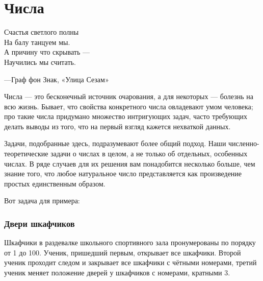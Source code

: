 \chapter*{Числа}

\setlength{\epigraphwidth}{.4\textwidth}
\epigraph{Счастья светлого полны\\ %
На балу танцуем мы.\\ %
А причину что скрывать ---\\ %
Научились мы считать.}{---Граф фон Знак, «Улица Сезам»}


 

Числа --- это бесконечный источник очарования, а для некоторых --- болезнь на всю жизнь. %
Бывает, что свойства конкретного числа овладевают умом человека;
про такие числа придумано множество интригующих задач,
часто требующих делать выводы из того, что на первый взгляд кажется нехваткой данных.

Задачи, подобранные здесь, подразумевают %
более общий подход. %
Наши численно-теоретические задачи о числах в целом, а не только об отдельных, особенных числах.
В ряде случаев для их решения вам понадобится несколько больше, чем знание того, 
что любое натуральное число представляется как произведение простых единственным образом.

\medskip

Вот задача для примера:

\subsection*{Двери шкафчиков}%

Шкафчики в раздевалке школьного спортивного зала пронумерованы по порядку от 1 до 100.
Ученик, пришедший первым, открывает все шкафчики.
Второй ученик проходит следом и закрывает все шкафчики с чётными номерами, третий ученик меняет положение дверей у шкафчиков с номерами, кратными 3.


